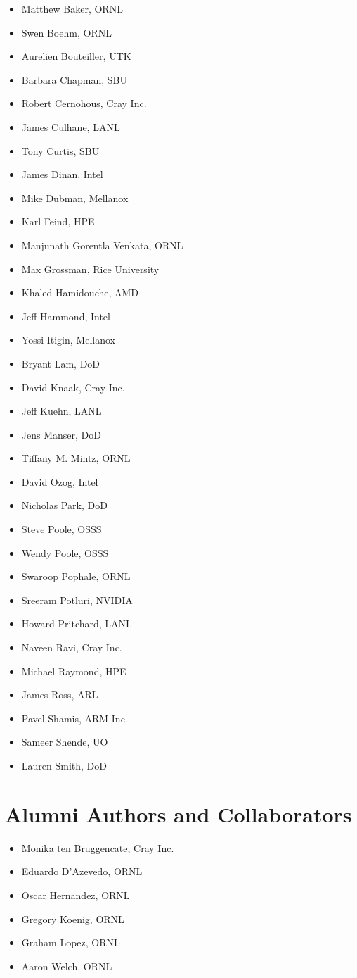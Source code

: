 \begin{itemize}
\item Matthew Baker, \ac{ORNL}
\item Swen Boehm, \ac{ORNL}
\item Aurelien Bouteiller, \ac{UTK}
\item Barbara Chapman, \ac{SBU}
\item Robert Cernohous, Cray Inc.
\item James Culhane, \ac{LANL}
\item Tony Curtis, \ac{SBU}
\item James Dinan, Intel
\item Mike Dubman, Mellanox
\item Karl Feind, \ac{HPE}
\item Manjunath Gorentla Venkata, \ac{ORNL}
\item Max Grossman, Rice University
\item Khaled Hamidouche, \ac{AMD}
\item Jeff Hammond, Intel
\item Yossi Itigin, Mellanox
\item Bryant Lam, \ac{DoD}
\item David Knaak, Cray Inc.
\item Jeff Kuehn, \ac{LANL}
\item Jens Manser, \ac{DoD}
\item Tiffany M. Mintz, \ac{ORNL}
\item David Ozog, Intel
\item Nicholas Park, \ac{DoD}
\item Steve Poole, \ac{OSSS}
\item Wendy Poole, \ac{OSSS}
\item Swaroop Pophale, \ac{ORNL}
\item Sreeram Potluri, NVIDIA
\item Howard Pritchard, \ac{LANL}
\item Naveen Ravi, Cray Inc.
\item Michael Raymond, \ac{HPE}
\item James Ross, \ac{ARL}
\item Pavel Shamis, ARM Inc.
\item Sameer Shende, \ac{UO}
\item Lauren Smith, \ac{DoD}

\end{itemize}

\section*{Alumni Authors and Collaborators}
\begin{itemize}
\item Monika ten Bruggencate, Cray Inc.
\item Eduardo D'Azevedo, \ac{ORNL}
\item Oscar Hernandez, \ac{ORNL}
\item Gregory Koenig, \ac{ORNL}
\item Graham Lopez, \ac{ORNL}
\item Aaron Welch, \ac{ORNL}

\end{itemize}

